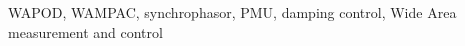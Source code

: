\documentclass[journal]{IEEEtran}
\begin{document}
\begin{abstract}

\end{abstract}

\begin{IEEEkeywords}
WAPOD, WAMPAC, synchrophasor, PMU, damping control, Wide Area measurement and control
\end{IEEEkeywords}






%
\IEEEpeerreviewmaketitle
\end{document}
